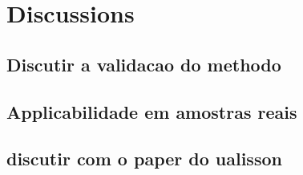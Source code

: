 \section{Discussions}

\subsection{Discutir a validacao do methodo}

\subsection{Applicabilidade em amostras reais}

\subsection{discutir com o paper do ualisson}








